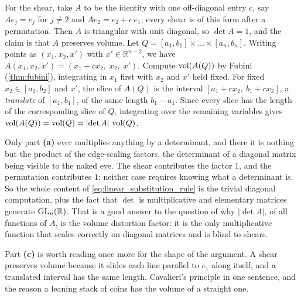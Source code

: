 \begin{exercisesolution}
\begin{enumerate}[label=\textbf{(\alph*)}]
    For the shear, take $A$ to be the identity with one off-diagonal entry $c$, say
    $A e_j = e_j$ for $j \neq 2$ and $Ae_2 = e_2 + c\,e_1$; every shear is of this form after a
    permutation. Then $A$ is triangular with unit diagonal, so $\det A = 1$, and the claim is that
    $A$ preserves volume. Let $Q = [a_1,b_1]\times\dots\times[a_n,b_n]$. Writing points as
    $(x_1,x_2,x')$ with $x' \in \mathbb{R}^{n-2}$, we have
    $A(x_1,x_2,x') = (x_1 + cx_2,\; x_2,\; x')$. Compute $\operatorname{vol}(A(Q))$ by Fubini
    (\cref{thm:fubini}), integrating in $x_1$ first with $x_2$ and $x'$ held fixed. For fixed
    $x_2 \in [a_2,b_2]$ and $x' $, the slice of $A(Q)$ is the interval
    $[a_1+cx_2,\ b_1+cx_2]$, a \emph{translate} of $[a_1,b_1]$, of the same length $b_1-a_1$.
    Since every slice has the length of the corresponding slice of $Q$, integrating over the
    remaining variables gives $\operatorname{vol}(A(Q)) = \operatorname{vol}(Q) = \lvert\det A\rvert\,\operatorname{vol}(Q)$.
\end{enumerate}
\begin{remark}
Only part \textbf{(a)} ever multiplies anything by a determinant, and there it is nothing but the
product of the edge-scaling factors, the determinant of a diagonal matrix being visible to the
naked eye. The shear contributes the factor $1$, and the permutation contributes $1$: neither case
requires knowing what a determinant is. So the whole content of
\eqref{eq:linear_substitution_rule} is the trivial diagonal computation, plus the fact that
$\det$ is multiplicative and elementary matrices generate $\operatorname{GL}_n(\mathbb{R})$. That is a good
answer to the question of why $\lvert\det A\rvert$, of all functions of $A$, is the volume
distortion factor: it is the only multiplicative function that scales correctly on diagonal
matrices and is blind to shears.

Part \textbf{(c)} is worth reading once more for the shape of the argument. A shear preserves
volume because it slides each line parallel to $e_1$ along itself, and a translated interval has
the same length. Cavalieri's principle in one sentence, and the reason a leaning stack of coins has
the volume of a straight one.
\end{remark}
\end{exercisesolution}

